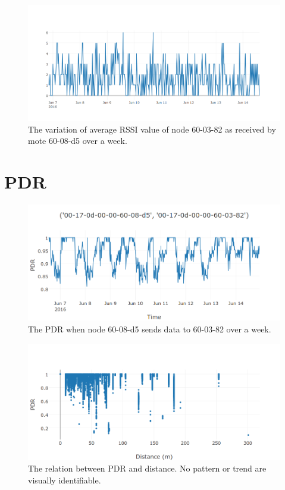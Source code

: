 \documentclass{sig-alternate}
\begin{document}
\begin{figure}
    \centering
    \includegraphics[width=\columnwidth]{rssi_variation}
    \caption{The variation of average RSSI value of node 60-03-82 as received by mote 60-08-d5 over a week.}
    \label{fig:rssi_variation}
\end{figure}

\section{PDR}
\label{sec:pdr}

\begin{figure}
    \centering
    \includegraphics[width=\columnwidth]{periodic_pdr}
    \caption{The PDR when node 60-08-d5 sends data to 60-03-82 over a week.}
    \label{fig:periodic_pdr}
\end{figure}

\begin{figure}
    \centering
    \includegraphics[width=\columnwidth]{pdr_dist}
    \caption{The relation between PDR and distance. No pattern or trend are visually identifiable.}
    \label{fig:pdr_dist}
\end{figure}
\end{document}
